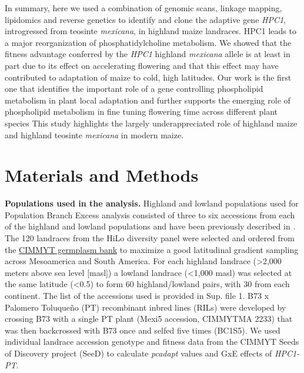 \documentclass[9pt,twocolumn,twoside,lineno]{biorxiv}
\newcommand{\mex}{\textit{mexicana}\xspace}
\newcommand{\hpc}{\textit{HPC1}\xspace}
\begin{document}
In summary, here we used a combination of genomic scans, linkage mapping, lipidomics and reverse genetics to identify and clone the adaptive gene \hpc, introgressed from teosinte  \mex, in highland maize landraces. HPC1 leads to a major reorganization of phosphatidylcholine metabolism. 
We showed that the fitness advantage conferred by the \hpc highland \mex allele is at least in part due to its effect on accelerating flowering and that this effect may have contributed to adaptation of maize to cold, high latitudes. 
Our work is the first one that identifies the important role of a gene controlling phospholipid metabolism in plant local adaptation and further supports the emerging role of phospholipid metabolism in fine tuning flowering time across different plant species \cite{Nakamura2014-qf, Susila2021-dz, Guo2019-pn}
This study highlights the largely underappreciated role of highland maize and highland teosinte \mex in modern maize.

\section{Materials and Methods}
\label{sec:materials:methods}
\textbf{Populations used in the analysis.} 
Highland and lowland populations used for Population Branch Excess analysis consisted of three to six accessions from each of the highland and lowland populations and have been previously described in \cite{Wang2020-mp, Wang2017-bc}. 
The 120 landraces from the HiLo diversity panel were selected and ordered from the \href{http://mgb.cimmyt.org/gringlobal/search.aspx}{CIMMYT germplasm bank} to maximize a good latitudinal gradient sampling across Mesoamerica and South America. 
For each highland landrace (>2,000 meters above sea level [masl]) a lowland landrace (<1,000 masl) was selected at the same latitude (<0.5\degree) to form 60 highland/lowland pairs, with 30 from each continent. 
The list of the accessions used is provided in Sup. file 1.   
B73 x Palomero Toluqueño (PT) recombinant inbred lines (RILs) were developed by crossing B73 with a single PT plant (Mexi5 accession, CIMMYTMA 2233) that was then backcrossed with B73 once and selfed five times (BC1S5).  
We used  individual landrace accession genotype and fitness data from the CIMMYT Seeds of Discovery project (SeeD) \cite{Gates2019-xu} to calculate \textit{pcadapt} \cite{Luu2017-ws} values and GxE effects of \textit{HPC1-PT}.
\end{document}
